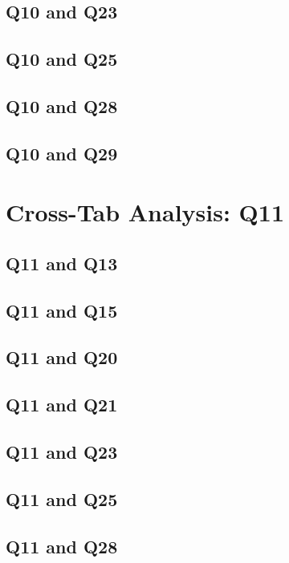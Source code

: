 \documentclass{report}
\begin{document}
\section{Q10 and Q23}\clearpage
\section{Q10 and Q25}\clearpage
\section{Q10 and Q28}\clearpage
\section{Q10 and Q29}\clearpage

\chapter{Cross-Tab Analysis: Q11}

\section{Q11 and Q13}\clearpage
\section{Q11 and Q15}\clearpage
\section{Q11 and Q20}\clearpage
\section{Q11 and Q21}\clearpage
\section{Q11 and Q23}\clearpage
\section{Q11 and Q25}\clearpage
\section{Q11 and Q28}\clearpage
\end{document}
